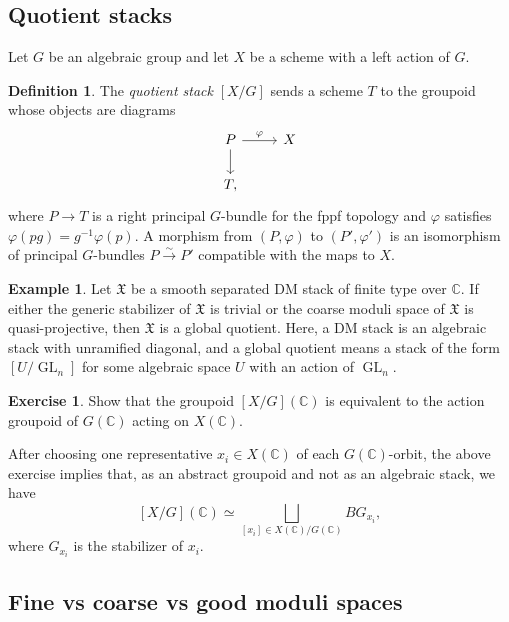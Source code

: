 \documentclass{amsart}
\theoremstyle{definition}
\newtheorem{defn}[thm]{Definition}
\newtheorem{exm}[thm]{Example}
\newtheorem{exer}[thm]{Exercise}
\theoremstyle{remark}
\theoremstyle{plain}
\theoremstyle{definition}
\theoremstyle{remark}
\newcommand{\C}{\mathbb{C}}
\newcommand{\mf}[1]{\mathfrak{#1}}
\newcommand{\on}[1]{\operatorname{#1}}
\newcommand{\1}{\mathbf{1}}
\newcommand{\2}{\mathbf{2}}
\newcommand{\3}{\mathbf{3}}
\begin{document}
\subsection{Quotient stacks}%
\label{sub:Quotient stacks}

Let \(G\) be an algebraic group and let \(X\) be a scheme with a left action of \(G\).

\begin{defn}
    The \textit{quotient stack} \([X/G]\) sends a scheme \(T\) to the groupoid whose objects are diagrams
    \begin{equation*}
    \begin{tikzcd}
        P \ar{r}{\varphi} \ar{d} & X \\
        T,
    \end{tikzcd}
    \end{equation*}
    where \(P\to T\) is a right principal \(G\)-bundle for the fppf topology and \(\varphi\) satisfies \(\varphi(pg)=g^{-1}\varphi(p)\). A morphism from \((P,\varphi)\) to \((P',\varphi')\) is an isomorphism of principal \(G\)-bundles \(P\xrightarrow{\sim}P'\) compatible with the maps to \(X\).
\end{defn}

\begin{exm}
    Let \(\mf{X}\) be a smooth separated DM stack of finite type over \(\C\). If either the generic stabilizer of \(\mf{X}\) is trivial or the coarse moduli space of \(\mf{X}\) is quasi-projective, then \(\mf{X}\) is a global quotient. Here, a DM stack is an algebraic stack with unramified diagonal, and a global quotient means a stack of the form \([U/\on{GL}_n]\) for some algebraic space \(U\) with an action of \(\on{GL}_n\).
\end{exm}

\begin{exer}
    Show that the groupoid \([X/G](\C)\) is equivalent to the action groupoid of \(G(\C)\) acting on \(X(\C)\).
\end{exer}

After choosing one representative \(x_i\in X(\C)\) of each \(G(\C)\)-orbit, the above exercise implies that, as an abstract groupoid and not as an algebraic stack, we have
\[ 
    [X/G](\C) \simeq \bigsqcup_{[x_i] \in X(\C)/G(\C)} BG_{x_i}, 
\]
where \(G_{x_i}\) is the stabilizer of \(x_i\).


\subsection{Fine vs coarse vs good moduli spaces}%
\label{sub:Fine vs coarse vs good moduli spaces}
\end{document}
